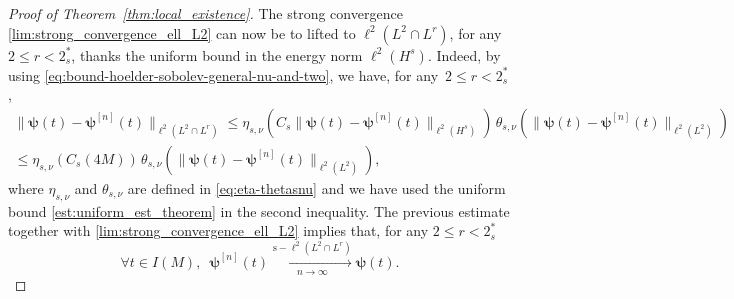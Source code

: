 \documentclass[12pt,a4paper]{amsart}
\numberwithin{equation}{section}
\newcommand{\ulpsi}{\boldsymbol{\psi}}
\newcommand{\twoasts}{{2^*_s}}
\newcommand{\thetasnu}{\theta_{s,\nu}}
\begin{document}
\begin{proof}[Proof of Theorem~\ref{thm:local_existence}]
		The strong convergence \eqref{lim:strong_convergence_ell_L2} can now be to lifted to $ \ell^2(L^2\cap L^r) $, for any $2\leq r<\twoasts$, thanks the uniform bound in the energy norm $ \ell^2(H^{s}) $. Indeed, by using \eqref{eq:bound-hoelder-sobolev-general-nu-and-two}, we have, for any~$2\leq r<\twoasts$,
		\begin{multline}
			\| \ulpsi(t) - \ulpsi^{[n]}(t) \|_{\ell^2(L^2\cap L^{r})} \leq   \eta_{s,\nu}(C_s \| \ulpsi(t) - \ulpsi^{[n]}(t) \|_{\ell^2(H^{s})}) \, \thetasnu  (\| \ulpsi(t) - \ulpsi^{[n]}(t) \|_{\ell^2(L^2)})  \\
			\leq   \eta_{s,\nu}(C_s ( 4M )) \, \thetasnu (\| \ulpsi(t) - \ulpsi^{[n]}(t) \|_{\ell^2(L^2)}) ,
		\end{multline} 
		where $\eta_{s,\nu}$ and $\thetasnu$ are defined in \eqref{eq:eta-thetasnu} and we have used the uniform bound \eqref{est:uniform_est_theorem} in the second inequality. The previous estimate together with \eqref{lim:strong_convergence_ell_L2} implies that, for any $ 2 \leq r < \twoasts  $
		\begin{equation}
			\forall t \in I(M),  \;\ \ulpsi^{[n]}(t) \xrightarrow[n\to\infty]{\mathrm{s}-\ell^2(L^2\cap L^r)} \ulpsi(t) .
		\end{equation}
		

\end{proof}
\end{document}
